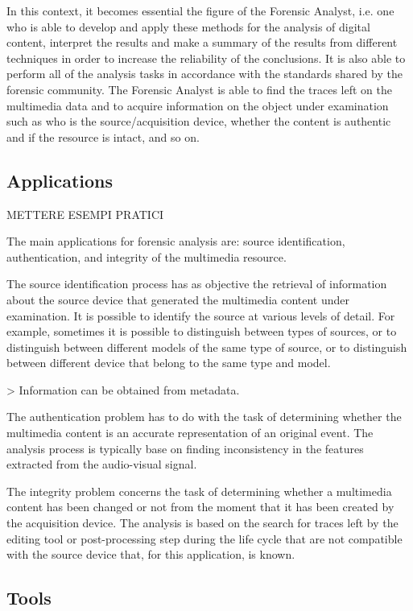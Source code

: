 In this context, it becomes essential the figure of the Forensic Analyst, i.e. one who is able to develop and apply these methods for the analysis of digital content, interpret the results and make a summary of the results from different techniques in order to increase the reliability of the conclusions. It is also able to perform all of the analysis tasks in accordance with the standards shared by the forensic community. The Forensic Analyst is able to find the traces left on the multimedia data and to acquire information on the object under examination such as who is the source/acquisition device, whether the content is authentic and if the resource is intact, and so on.

\subsection{Applications}

{METTERE ESEMPI PRATICI}

The main applications for forensic analysis are: source identification, authentication, and integrity of the multimedia resource.

The source identification process has as objective the retrieval of information about the source device that generated the multimedia content under examination. It is possible to identify the source at various levels of detail. For example, sometimes it is possible to distinguish between types of sources, or to distinguish between different models of the same type of source, or to distinguish between different device that belong to the same type and model.

> Information can be obtained from metadata.

The authentication problem has to do with the task of determining whether the multimedia content is an accurate representation of an original event. The analysis process is typically base on finding inconsistency in the features extracted from the audio-visual signal.

The integrity problem concerns the task of determining whether a multimedia content has been changed or not from the moment that it has been created by the acquisition device. The analysis is based on the search for traces left by the editing tool or post-processing step during the life cycle that are not compatible with the source device that, for this application, is known.

\subsection{Tools}

